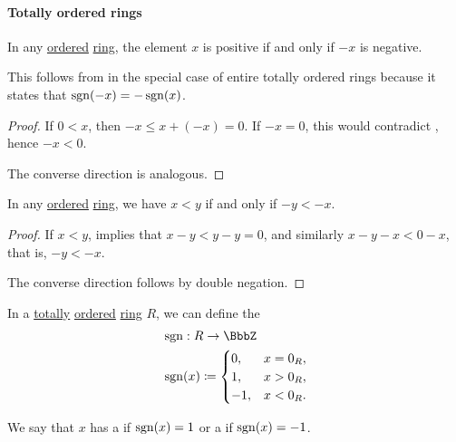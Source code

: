\paragraph{Totally ordered rings}

\begin{proposition}\label{thm:ordered_ring_inversion}
  In any \hyperref[def:ordered_semiring]{ordered} \hyperref[def:ring]{ring}, the element \( x \) is positive if and only if \( -x \) is negative.
\end{proposition}
\begin{comments}
  \item This follows from  in the special case of entire totally ordered rings because it states that \( \operatorname{sgn}(-x) = -\operatorname{sgn}(x) \).
\end{comments}
\begin{proof}
  If \( 0 < x \), then \( -x \leq x + (-x) = 0 \). If \( -x = 0 \), this would contradict , hence \( -x < 0 \).

  The converse direction is analogous.
\end{proof}

\begin{proposition}\label{thm:ordered_ring_order_inversion}
  In any \hyperref[def:ordered_semiring]{ordered} \hyperref[def:ring]{ring}, we have \( x < y \) if and only if \( -y < -x \).
\end{proposition}
\begin{proof}
  If \( x < y \),  implies that \( x - y < y - y = 0 \), and similarly \( x - y - x < 0 - x \), that is, \( -y < -x \).

  The converse direction follows by double negation.
\end{proof}

\begin{definition}\label{def:totally_ordered_ring_signum}\mimprovised
  In a \hyperref[def:totally_ordered_set]{totally} \hyperref[def:ordered_semiring]{ordered} \hyperref[def:ring]{ring} \( R \), we can define the 
  \begin{equation*}
    \begin{aligned}
      &\sgn: R \to \BbbZ \\
      &\sgn(x) \coloneqq \begin{cases}
        0,  &x = 0_R, \\
        1,  &x > 0_R, \\
        -1, &x < 0_R.
      \end{cases}
    \end{aligned}
  \end{equation*}

  We say that \( x \) has a  if \( \operatorname{sgn}(x) = 1 \) or a  if \( \operatorname{sgn}(x) = -1 \).
\end{definition}

